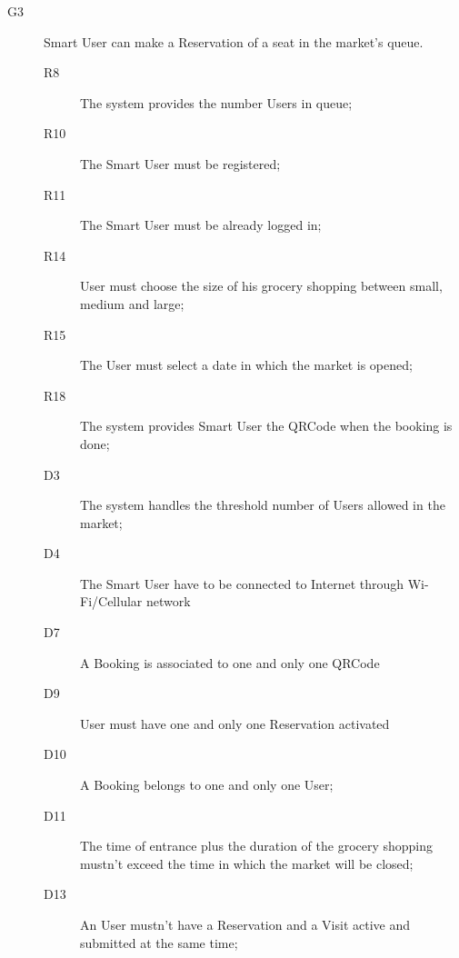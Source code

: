 \begin{description}
    \item[G3]Smart User can make a Reservation of a seat in the market's queue.
    \begin{description}
    \item[R8] The system provides the number Users in queue; %
    \item[R10] The Smart User must be registered;
    \item[R11] The Smart User must be already logged in;
    \item[R14] User must choose the size of his grocery shopping between small, medium and large;    
    \item[R15] The User must select a date in which the market is opened;
    \item[R18] The system provides Smart User the QRCode when the booking is done; 
    \item[D3] The system handles the threshold number of Users allowed in the market;
    \item[D4] The Smart User have to be connected to Internet through Wi-Fi/Cellular network
    \item[D7] A Booking is associated to one and only one QRCode
    \item[D9] User must have one and only one Reservation activated
    \item[D10] A Booking belongs to one and only one User;
    \item[D11] The time of entrance plus the duration of the grocery shopping mustn’t exceed the time in which the market will be closed; 
    \item[D13] An User mustn’t have a Reservation and a Visit active and submitted at the same time; 
    \end{description}
    

\end{description}
